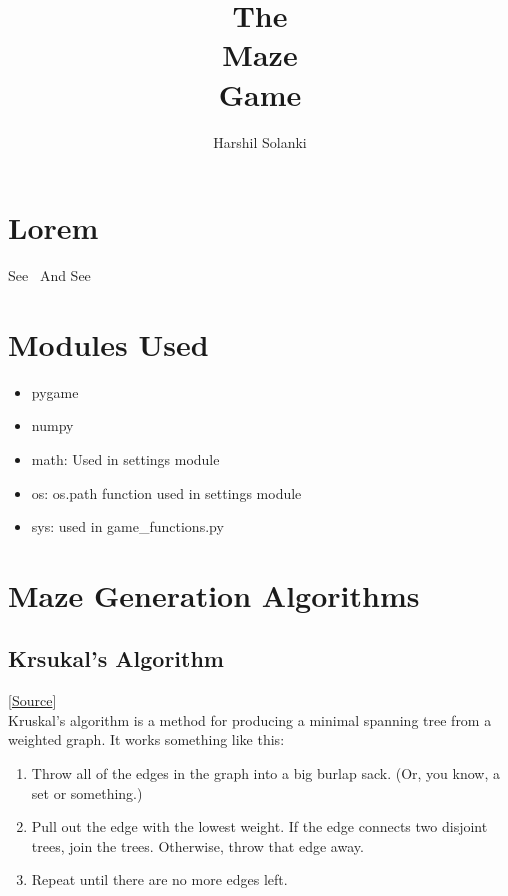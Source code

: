\documentclass{article}
\begin{document}
\title{
The\\
Maze\\
Game\\
}
\author{Harshil Solanki}
\date{}
\maketitle
\tableofcontents
\clearpage


\section{Lorem}
See~\cite{thebook}
And See~\cite{menu-geeksforgeeks}

\section{Modules Used}
\begin{itemize}
    \item pygame
    \item numpy
    \item math: Used in settings module
    \item os: os.path function used in settings module
    \item sys: used in game_functions.py
\end{itemize}


\section{Maze Generation Algorithms}
\subsection{Krsukal's Algorithm}
[\href{https://weblog.jamisbuck.org/2011/1/3/maze-generation-kruskal-s-algorithm}{Source}]\\
Kruskal's algorithm is a method for producing a minimal spanning tree from a weighted graph. It works something like this:

\begin{enumerate}
    \item Throw all of the edges in the graph into a big burlap sack. (Or, you know, a set or something.)
    \item Pull out the edge with the lowest weight. If the edge connects two disjoint trees, join the trees. Otherwise, throw that edge away.
    \item Repeat until there are no more edges left.
\end{enumerate}
\end{document}
